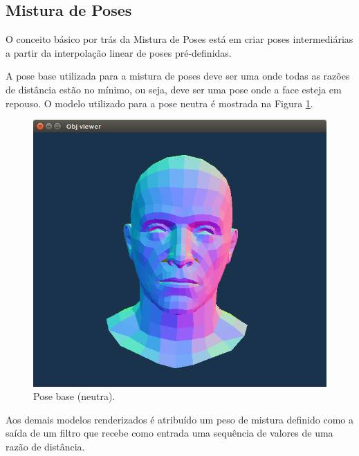 \subsection{Mistura de Poses}

O conceito básico por trás da Mistura de Poses está em criar poses
intermediárias a partir da interpolação linear de poses pré-definidas.

A pose base utilizada para a mistura de poses deve ser uma onde todas as razões
de distância estão no mínimo, ou seja, deve ser uma pose onde a face esteja em
repouso. O modelo utilizado para a pose neutra é mostrada na Figura
\ref{fig:blend-shapes-base-model}.

\begin{figure}[!htb]
   \centering
  \includegraphics[width=0.8\linewidth]{./figs/rosto-neutro.png}
\caption{Pose base (neutra).}
\label{fig:blend-shapes-base-model}
\end{figure}

Aos demais modelos renderizados é atribuído um peso de mistura definido como a
saída de um filtro que recebe como entrada uma sequência de valores de uma razão
de distância.

